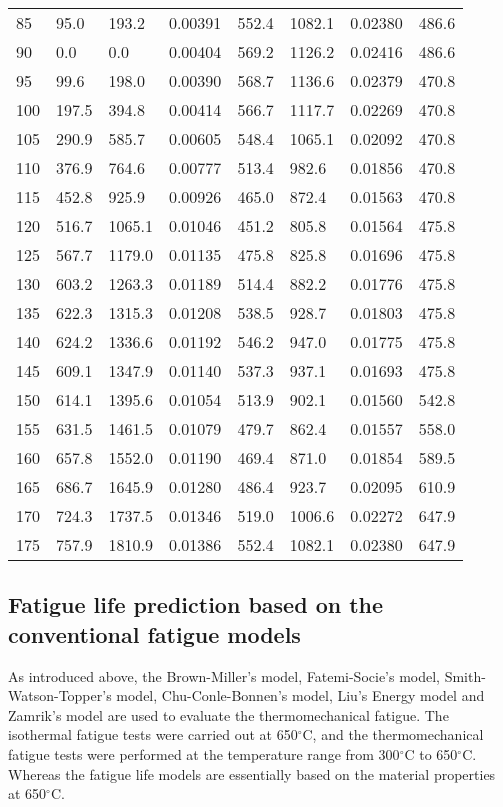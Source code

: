 \begin{table}[htbp]
\begin{tabular}{p{1.5cm}p{1.5cm}p{1.5cm}p{1.5cm}p{1.5cm}p{1.5cm}p{1.5cm}p{1.5cm}}
    85    & 95.0  & 193.2  & 0.00391  & 552.4  & 1082.1  & 0.02380  & 486.6  \\
    90    & 0.0   & 0.0   & 0.00404  & 569.2  & 1126.2  & 0.02416  & 486.6  \\
    95    & 99.6  & 198.0  & 0.00390  & 568.7  & 1136.6  & 0.02379  & 470.8  \\
    100   & 197.5  & 394.8  & 0.00414  & 566.7  & 1117.7  & 0.02269  & 470.8  \\
    105   & 290.9  & 585.7  & 0.00605  & 548.4  & 1065.1  & 0.02092  & 470.8  \\
    110   & 376.9  & 764.6  & 0.00777  & 513.4  & 982.6  & 0.01856  & 470.8  \\
    115   & 452.8  & 925.9  & 0.00926  & 465.0  & 872.4  & 0.01563  & 470.8  \\
    120   & 516.7  & 1065.1  & 0.01046  & 451.2  & 805.8  & 0.01564  & 475.8  \\
    125   & 567.7  & 1179.0  & 0.01135  & 475.8  & 825.8  & 0.01696  & 475.8  \\
    130   & 603.2  & 1263.3  & 0.01189  & 514.4  & 882.2  & 0.01776  & 475.8  \\
    135   & 622.3  & 1315.3  & 0.01208  & 538.5  & 928.7  & 0.01803  & 475.8  \\
    140   & 624.2  & 1336.6  & 0.01192  & 546.2  & 947.0  & 0.01775  & 475.8  \\
    145   & 609.1  & 1347.9  & 0.01140  & 537.3  & 937.1  & 0.01693  & 475.8  \\
    150   & 614.1  & 1395.6  & 0.01054  & 513.9  & 902.1  & 0.01560  & 542.8  \\
    155   & 631.5  & 1461.5  & 0.01079  & 479.7  & 862.4  & 0.01557  & 558.0  \\
    160   & 657.8  & 1552.0  & 0.01190  & 469.4  & 871.0  & 0.01854  & 589.5  \\
    165   & 686.7  & 1645.9  & 0.01280  & 486.4  & 923.7  & 0.02095  & 610.9  \\
    170   & 724.3  & 1737.5  & 0.01346  & 519.0  & 1006.6  & 0.02272  & 647.9  \\
    175   & 757.9  & 1810.9  & 0.01386  & 552.4  & 1082.1  & 0.02380  & 647.9  \\
    \bottomrule
    \end{tabular}%
  \label{Tab:stress_on_material_plane}%
\end{table}%

\subsection{Fatigue life prediction based on the conventional fatigue models}
\noindent
As introduced above, the Brown-Miller's model, Fatemi-Socie's model, Smith-Watson-Topper's model, Chu-Conle-Bonnen's model, Liu's Energy model and Zamrik's model are used to evaluate the thermomechanical fatigue. The isothermal fatigue tests were carried out at 650$^\circ$C, and the thermomechanical fatigue tests were performed at the temperature range from 300$^\circ$C to 650$^\circ$C.
Whereas the fatigue life models are essentially based on the material properties at 650$^\circ$C.

